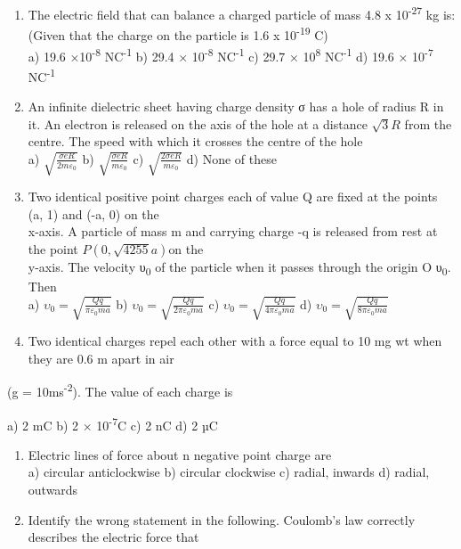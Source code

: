 \begin{enumerate}
\def\labelenumi{\arabic{enumi}.}
\setcounter{enumi}{26}
\item
  The electric field that can balance a charged particle of mass 4.8 x
  10\textsuperscript{-27} kg is: (Given that the charge on the particle
  is 1.6 x 10\textsuperscript{-19} C)\\
  a) 19.6 ×10\textsuperscript{-8} NC\textsuperscript{-1} b) 29.4 ×
  10\textsuperscript{-8} NC\textsuperscript{-1} c) 29.7 ×
  10\textsuperscript{8} NC\textsuperscript{-1} d) 19.6 ×
  10\textsuperscript{-7} NC\textsuperscript{-1}
\item
  An infinite dielectric sheet having charge density σ has a hole of
  radius R in it. An electron is released on the axis of the hole at a
  distance \(\sqrt{3}R\) from the centre. The speed with which it
  crosses the centre of the hole\\
  a) \(\sqrt{\frac{\sigma eR}{2m\varepsilon_{0}}}\) b)
  \(\sqrt{\frac{\sigma eR}{m\varepsilon_{0}}}\) c)
  \(\sqrt{\frac{2\sigma eR}{m\varepsilon_{0}}}\) d) None of these
\item
  Two identical positive point charges each of value Q are fixed at the
  points (a, 1) and (-a, 0) on the\\
  x-axis. A particle of mass m and carrying charge -q is released from
  rest at the point \(P\left( 0,\sqrt{4255}a \right)\)on the\\
  y-axis. The velocity υ\textsubscript{0} of the particle when it passes
  through the origin O υ\textsubscript{0}. Then\\
  a) \(\upsilon_{0} = \sqrt{\frac{Qq}{\pi\varepsilon_{0}ma}}\) b)
  \(\upsilon_{0} = \sqrt{\frac{Qq}{2\pi\varepsilon_{0}ma}}\) c)
  \(\upsilon_{0} = \sqrt{\frac{Qq}{4\pi\varepsilon_{0}ma}}\) d)
  \(\upsilon_{0} = \sqrt{\frac{Qq}{8\pi\varepsilon_{0}ma}}\)
\item
  Two identical charges repel each other with a force equal to 10 mg wt
  when they are 0.6 m apart in air
\end{enumerate}

(g = 10ms\textsuperscript{-2}). The value of each charge is

a) 2 mC b) 2 × 10\textsuperscript{-7}C c) 2 nC d) 2 µC

\begin{enumerate}
\def\labelenumi{\arabic{enumi}.}
\setcounter{enumi}{30}
\item
  Electric lines of force about n negative point charge are\\
  a) circular anticlockwise b) circular clockwise c) radial, inwards d)
  radial, outwards
\item
  Identify the wrong statement in the following. Coulomb's law correctly
  describes the electric force that
\end{enumerate}

